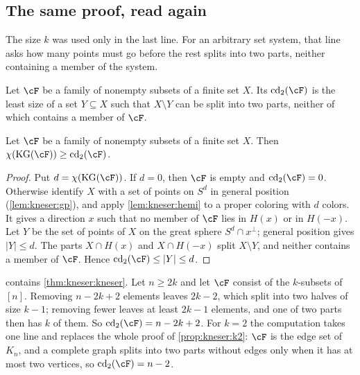 \begin{refsection}
\subsection{The same proof, read again}

The size $k$ was used only in the last line. For an arbitrary set system, that line asks how many points must go before the rest splits into two parts, neither containing a member of the system.

\begin{definition}\label{def:kneser:cd}
Let $\cF$ be a family of nonempty subsets of a finite set $X$. Its  $\kneserCd(\cF)$ is the least size of a set $Y\subseteq X$ such that $X\setminus Y$ can be split into two parts, neither of which contains a member of $\cF$.
\end{definition}

\begin{theorem}\label{thm:kneser:dolnikov}
Let $\cF$ be a family of nonempty subsets of a finite set $X$. Then $\chi(\kneserKG(\cF))\ge\kneserCd(\cF)$.
\end{theorem}

\begin{proof}
Put $d=\chi(\kneserKG(\cF))$. If $d=0$, then $\cF$ is empty and $\kneserCd(\cF)=0$. Otherwise identify $X$ with a set of points on $S^d$ in general position (\cref{lem:kneser:gp}), and apply \cref{lem:kneser:hemi} to a proper coloring with $d$ colors. It gives a direction $x$ such that no member of $\cF$ lies in $H(x)$ or in $H(-x)$. Let $Y$ be the set of points of $X$ on the great sphere $S^d\cap x^\perp$; general position gives $|Y|\le d$. The parts $X\cap H(x)$ and $X\cap H(-x)$ split $X\setminus Y$, and neither contains a member of $\cF$. Hence $\kneserCd(\cF)\le|Y|\le d$.
\end{proof}

 contains \cref{thm:kneser:kneser}. Let $n\ge2k$ and let $\cF$ consist of the $k$-subsets of $[n]$. Removing $n-2k+2$ elements leaves $2k-2$, which split into two halves of size $k-1$; removing fewer leaves at least $2k-1$ elements, and one of two parts then has $k$ of them. So $\kneserCd(\cF)=n-2k+2$. For $k=2$ the computation takes one line and replaces the whole proof of \cref{prop:kneser:k2}: $\cF$ is the edge set of $K_n$, and a complete graph splits into two parts without edges only when it has at most two vertices, so $\kneserCd(\cF)=n-2$.


\end{refsection}
